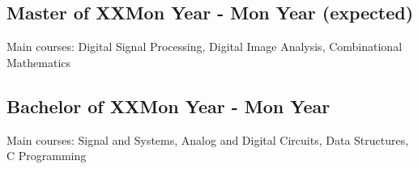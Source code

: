 \vspace*{10pt}
\subsection {{Master of XX}\hfill Mon Year - Mon Year (expected)}
\vspace*{5pt}
Main courses: Digital Signal Processing, Digital Image Analysis, Combinational Mathematics

\vspace*{6pt}
\subsection{{Bachelor of XX}\hfill Mon Year - Mon Year}
\vspace*{5pt}
Main courses: Signal and Systems, Analog and Digital Circuits, Data Structures, C Programming
